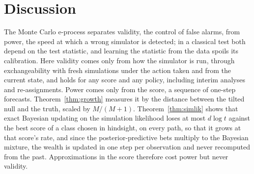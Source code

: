 
\section{Discussion}\label{sec:discussion}\label{sec:related}

The Monte Carlo e-process separates validity, the control of false alarms,
from power, the speed at which a wrong simulator is detected; in a classical
test both depend on the test statistic, and learning the statistic from the
data spoils its calibration. Here validity comes only from how the simulator
is run, through exchangeability with fresh simulations under the action taken
and from the current state, and holds for any score and any policy, including
interim analyses and re-assignments. Power comes only from the score, a
sequence of one-step forecasts. Theorem~\ref{thm:growth} measures it by the
distance between the tilted null and the truth, scaled by $M/(M+1)$.
Theorem~\ref{thm:simlik} shows that exact Bayesian updating on the simulation
likelihood loses at most $d\log t$ against the best score of a class chosen in
hindsight, on every path, so that it grows at that score's rate, and since the
posterior-predictive bets multiply to the Bayesian mixture, the wealth is
updated in one step per observation and never recomputed from the past.
Approximations in the score therefore cost power but never validity.

